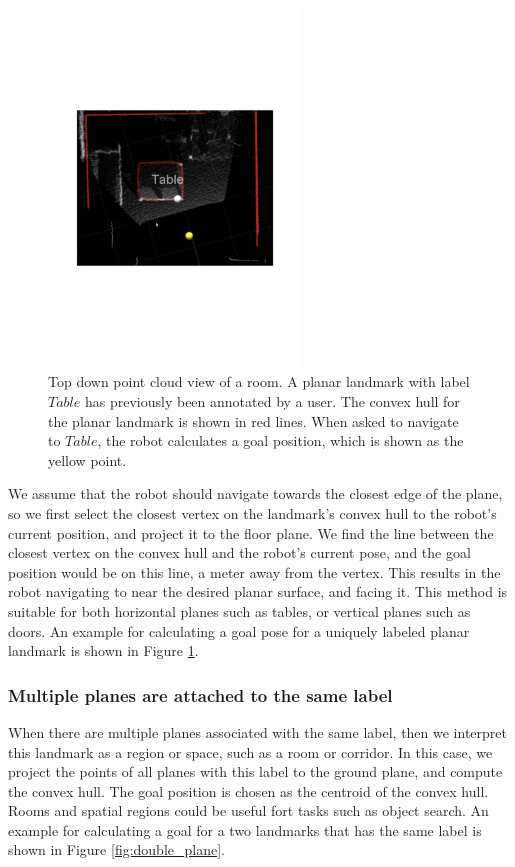 \begin{figure}[ht!]
\centering
\includegraphics[width=0.6\textwidth]{pics/single_plane}
\caption{Top down point cloud view of a room. A planar landmark with label $Table$ has previously been annotated by a user. The convex hull for the planar landmark is shown in red lines. When asked to navigate to $Table$, the robot calculates a goal position, which is shown as the yellow point.}
\label{fig:single_plane}
\end{figure}

We assume that the robot should navigate towards the closest edge of the plane, so we first select the closest vertex on the landmark's convex hull to the robot's current position, and project it to the floor plane. We find the line between the closest vertex on the convex hull and the robot's current pose, and the goal position would be on this line, a meter away from the vertex. This results in the robot navigating to near the desired planar surface, and facing it. This method is suitable for both horizontal planes such as tables, or vertical planes such as doors. An example for calculating a goal pose for a uniquely labeled planar landmark is shown in Figure \ref{fig:single_plane}.

\subsubsection{Multiple planes are attached to the same label}

When there are multiple planes associated with the same label, then we interpret this landmark as a region or space, such as a room or corridor. In this case, we project the points of all planes with this label to the ground plane, and compute the convex hull. The goal position is chosen as the centroid of the convex hull. Rooms and spatial regions could be useful fort tasks such as object search. An example for calculating a goal for a two landmarks that has the same label is shown in Figure \ref{fig:double_plane}. 

